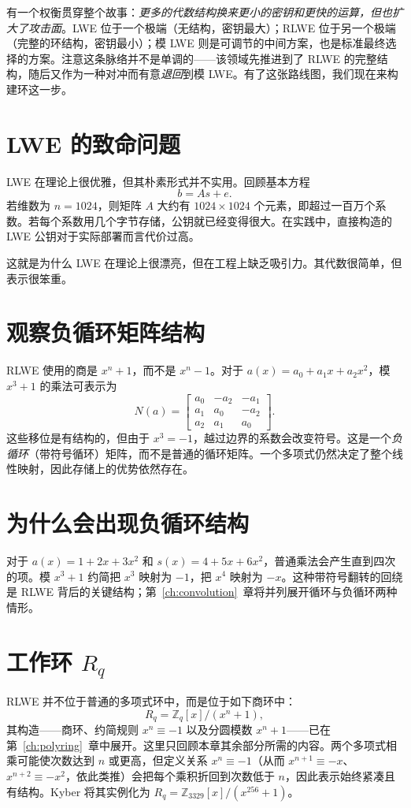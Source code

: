 有一个权衡贯穿整个故事：\emph{更多的代数结构换来更小的密钥和更快的运算，但也扩大了攻击面}。LWE 位于一个极端（无结构，密钥最大）；RLWE 位于另一个极端（完整的环结构，密钥最小）；模 LWE 则是可调节的中间方案，也是标准最终选择的方案。注意这条脉络并不是单调的——该领域先推进到了 RLWE 的完整结构，随后又作为一种对冲而有意\emph{退回}到模 LWE。有了这张路线图，我们现在来构建环这一步。

\section{LWE 的致命问题}

LWE 在理论上很优雅，但其朴素形式并不实用。回顾基本方程
\[
b = A s + e.
\]
若维数为 $n=1024$，则矩阵 $A$ 大约有 $1024\times 1024$ 个元素，即超过一百万个系数。若每个系数用几个字节存储，公钥就已经变得很大。在实践中，直接构造的 LWE 公钥对于实际部署而言代价过高。

这就是为什么 LWE 在理论上很漂亮，但在工程上缺乏吸引力。其代数很简单，但表示很笨重。

\section{观察负循环矩阵结构}

RLWE 使用的商是 $x^n+1$，而不是 $x^n-1$。对于 $a(x)=a_0+a_1x+a_2x^2$，模 $x^3+1$ 的乘法可表示为
\[
N(a)=\begin{bmatrix}
a_0&-a_2&-a_1\\
a_1&a_0&-a_2\\
a_2&a_1&a_0
\end{bmatrix}.
\]
这些移位是有结构的，但由于 $x^3=-1$，越过边界的系数会改变符号。这是一个\emph{负循环}（带符号循环）矩阵，而不是普通的循环矩阵。一个多项式仍然决定了整个线性映射，因此存储上的优势依然存在。

\section{为什么会出现负循环结构}

对于 $a(x)=1+2x+3x^2$ 和 $s(x)=4+5x+6x^2$，普通乘法会产生直到四次的项。模 $x^3+1$ 约简把 $x^3$ 映射为 $-1$，把 $x^4$ 映射为 $-x$。这种带符号翻转的回绕是 RLWE 背后的关键结构；第~\ref{ch:convolution}~章将并列展开循环与负循环两种情形。

\section{工作环 $R_q$}

RLWE 并不位于普通的多项式环中，而是位于如下商环中：
\[
R_q = \mathbb{Z}_q[x]/(x^n+1),
\]
其构造——商环、约简规则 $x^n\equiv-1$ 以及分圆模数 $x^n+1$——已在第~\ref{ch:polyring}~章中展开。这里只回顾本章其余部分所需的内容。两个多项式相乘可能使次数达到 $n$ 或更高，但定义关系 $x^n\equiv-1$（从而 $x^{n+1}\equiv-x$、$x^{n+2}\equiv-x^2$，依此类推）会把每个乘积折回到次数低于 $n$，因此表示始终紧凑且有结构。Kyber 将其实例化为 $R_q=\mathbb{Z}_{3329}[x]/(x^{256}+1)$。

